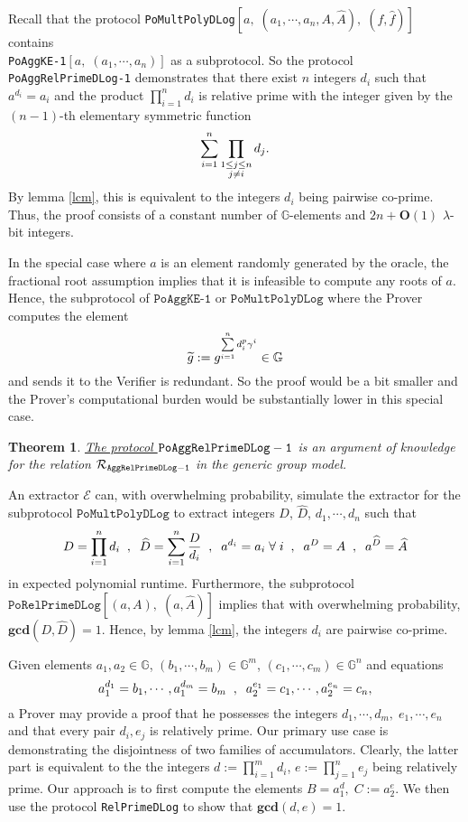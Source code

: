 \documentclass[11pt, lettersize, notitlepage, leqno, footskip=0.6cm]{article}
\newcommand{\pl}{\prod\limits}
\newcommand{\slim}{\sum\limits}
\newcommand{\ttt}{\texttt}
\newcommand{\bG}{\mathbb{G}}
\newcommand{\wti}{\widetilde}
\newcommand{\mc}{\mathcal}
\newcommand{\mb}{\mathbb}
\newcommand{\mbf}{\mathbf}
\newcommand{\lam}{\lambda}
\newcommand{\what}{\widehat}
\newcommand{\bO}{\mbf{O}}
\newcommand{\vs}{\vspace{-0.15cm}}
\newcommand{\noin}{\noindent}
\newcommand{\op}{overwhelming probability}
\newcommand{\GCD}{\mbf{gcd}}
\newcommand{\E}{\mc{E}}
\newtheorem{Thm}{Theorem}[section]
\numberwithin{equation}{section}
\begin{document}
Recall that the protocol \verb|PoMultPolyDLog|$[a,\;(a_1,\cdots,a_n,A, \what{A}),\; (f,\what{f})]$  contains\\ \verb|PoAggKE-1|$[a,\;(a_1,\cdots,a_n)]$ as a subprotocol. So the protocol \verb|PoAggRelPrimeDLog-1| demonstrates that there exist $n$ integers $d_i$ such that $a^{d_i} = a_i$ and the product $\prod_{i=1}^n d_i$ is relative prime with the integer given by the $(n-1)$-th elementary symmetric function \vs $$\slim_{i=1}^n \pl_{\substack{1\leq j\leq n \\ j\neq i}} d_j. \vs $$ By lemma \ref{lcm}, this is equivalent to the integers $d_i$ being pairwise co-prime. Thus, the proof consists of a constant number of $\mb{G}$-elements and $2n+\bO(1)$ $\lam$-bit integers. 

In the special case where $a$ is an element randomly generated by the oracle, the fractional root assumption implies that it is infeasible to compute any roots of $a$. Hence, the subprotocol of $\ttt{PoAggKE-1}$ or $\ttt{PoMultPolyDLog}$ where the Prover computes the element \vs $$\wti{g}:= g^{\slim_{i=1}^n d_i^{p}\gamma^i}\in \bG\vs $$ and sends it to the Verifier is redundant. So the proof would be a bit smaller and the Prover's computational burden would be substantially lower in this special case. \vspace{0.2cm}

\begin{Thm} \hyperlink{RP1}{The protocol $\tt{PoAggRelPrimeDLog}-1$} is an argument of knowledge for the relation $\mc{R}_{\tt{AggRelPrimeDLog-1}}$ in the generic group model.\end{Thm}

\begin{prf} An extractor $\E$ can, with \op, simulate the extractor for the\\ subprotocol $\ttt{PoMultPolyDLog}$ to extract integers $D$, $\what{D}$, $d_1,\cdots,d_n$ such that \vs $$D = \pl_{i=1}^n d_i \; \;,\;\;\what{D} = \slim_{i=1}^n \frac{D}{d_i}  \; \;,\;\; a^{d_i} = a_i\;\forall\;i  \; \;,\;\; a^{D} = A \; \;,\;\; a^{\what{D}} = \what{A}\vs $$ in expected polynomial runtime. Furthermore, the subprotocol $\ttt{PoRelPrimeDLog}[(a,A),\;(a,\what{A})]$ implies that with \op, $\GCD(D,\what{D}) = 1$. Hence, by lemma \ref{lcm}, the integers $d_i$ are pairwise co-prime.\end{prf}



\bigskip

\noin Given elements $a_1, a_2\in \mb{G}$, $(b_1,\cdots,b_m)\in\bG^m$, $(c_1,\cdots,c_m)\in\bG^n$ and equations \vs $$a_1^{d_1} = b_1,\cdots, a_1^{d_m}= b_m\;\;,\;\; a_2^{e_1} = c_1,\cdots, a_2^{e_n} = c_n, \vs$$ a Prover may provide a proof that he possesses the integers $d_1,\cdots, d_m,\;e_1,\cdots, e_n$ and that every pair $d_i, e_j$ is relatively prime. Our primary use case is demonstrating the disjointness of two families of accumulators. Clearly, the latter part is equivalent to the the integers $d:=\prod_{i=1}^m d_i$, $e:=\prod_{j=1}^n e_j$ being relatively prime. Our approach is to first compute the elements $B = a_1^d,\;C:= a_2^{e}$. We then  use the protocol \verb|RelPrimeDLog| to show that $\GCD(d, e) = 1$. 
\end{document}
